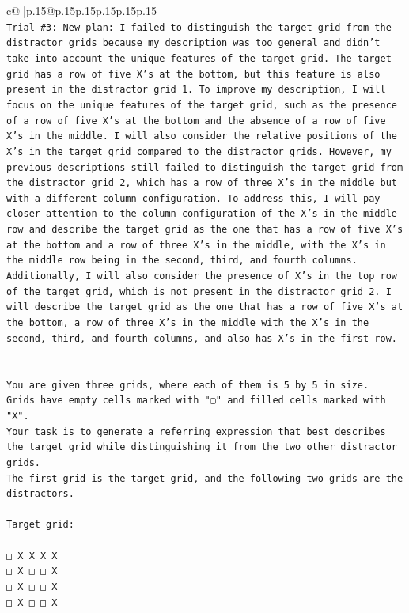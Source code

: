 \documentclass{article}
\begin{document}
{\begin{supertabular}{c@{$\;$}|p{.15\linewidth}@{}p{.15\linewidth}p{.15\linewidth}p{.15\linewidth}p{.15\linewidth}p{.15\linewidth}}
{{{\\ 
\texttt{Trial \#3: New plan: I failed to distinguish the target grid from the distractor grids because my description was too general and didn't take into account the unique features of the target grid. The target grid has a row of five X's at the bottom, but this feature is also present in the distractor grid 1. To improve my description, I will focus on the unique features of the target grid, such as the presence of a row of five X's at the bottom and the absence of a row of five X's in the middle. I will also consider the relative positions of the X's in the target grid compared to the distractor grids. However, my previous descriptions still failed to distinguish the target grid from the distractor grid 2, which has a row of three X's in the middle but with a different column configuration. To address this, I will pay closer attention to the column configuration of the X's in the middle row and describe the target grid as the one that has a row of five X's at the bottom and a row of three X's in the middle, with the X's in the middle row being in the second, third, and fourth columns. Additionally, I will also consider the presence of X's in the top row of the target grid, which is not present in the distractor grid 2. I will describe the target grid as the one that has a row of five X's at the bottom, a row of three X's in the middle with the X's in the second, third, and fourth columns, and also has X's in the first row.} \\
\\ 
\\ 
\texttt{You are given three grids, where each of them is 5 by 5 in size.} \\
\texttt{Grids have empty cells marked with "▢" and filled cells marked with "X".} \\
\texttt{Your task is to generate a referring expression that best describes the target grid while distinguishing it from the two other distractor grids.} \\
\texttt{The first grid is the target grid, and the following two grids are the distractors.} \\
\\ 
\texttt{Target grid:} \\
\\ 
\texttt{□ X X X X} \\
\texttt{□ X □ □ X} \\
\texttt{□ X □ □ X} \\
\texttt{□ X □ □ X} \\
}}}
\end{supertabular}}
\end{document}
